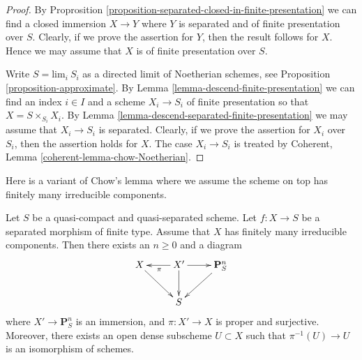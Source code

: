 \begin{proof}
By Proprosition \ref{proposition-separated-closed-in-finite-presentation}
we can find a closed immersion $X \to Y$ where $Y$ is separated
and of finite presentation over $S$. Clearly, if we prove the assertion
for $Y$, then the result follows for $X$. Hence we may assume that
$X$ is of finite presentation over $S$.

\medskip\noindent
Write $S = \text{lim}_i\ S_i$ as a directed limit of Noetherian schemes, see
Proposition \ref{proposition-approximate}. By
Lemma \ref{lemma-descend-finite-presentation} we can
find an index $i \in I$ and a scheme $X_i \to S_i$ of finite presentation
so that $X = S \times_{S_i} X_i$.
By Lemma \ref{lemma-descend-separated-finite-presentation}
we may assume that $X_i \to S_i$ is separated.
Clearly, if we prove the assertion for
$X_i$ over $S_i$, then the assertion holds for $X$. The case
$X_i \to S_i$ is treated by
Coherent, Lemma \ref{coherent-lemma-chow-Noetherian}.
\end{proof}

\noindent
Here is a variant of Chow's lemma where we assume the scheme
on top has finitely many irreducible components.

\begin{lemma}
\label{lemma-chow-EGA}
Let $S$ be a quasi-compact and quasi-separated scheme.
Let $f : X \to S$ be a separated morphism of finite type.
Assume that $X$ has finitely many irreducible components.
Then there exists an $n \geq 0$ and a diagram
$$
\xymatrix{
X \ar[rd] & X' \ar[d] \ar[l]^\pi \ar[r] & \mathbf{P}^n_S \ar[dl] \\
& S &
}
$$
where $X' \to \mathbf{P}^n_S$ is an immersion, and
$\pi : X' \to X$ is proper and surjective. Moreover, there exists
an open dense subscheme $U \subset X$ such that $\pi^{-1}(U) \to U$
is an isomorphism of schemes.
\end{lemma}

